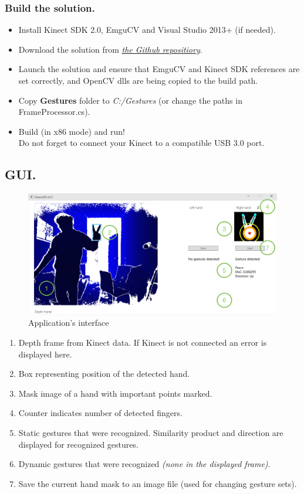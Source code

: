 \documentclass[a4paper,11pt,oneside]{article}
\begin{document}
\subsubsection{Build the solution.}

\begin{itemize}
\item Install Kinect SDK 2.0, EmguCV and Visual Studio 2013+ (if needed).
\item Download the solution from \href{https://github.com/dmitryfd/KinectGR}{\textit{the Github repositiory}}.
\item Launch the solution and ensure that EmguCV and Kinect SDK references are set correctly, and OpenCV dlls are being copied to the build path. 
\item Copy \textbf{Gestures} folder to \textit{C:/Gestures} (or change the paths in FrameProcessor.cs).
\item Build (in x86 mode) and run! \\Do not forget to connect your Kinect to a compatible USB 3.0 port.
\end{itemize}

\subsection{GUI.}

\begin{figure}[H]
\centering
\includegraphics[scale=0.6]{app-gui.png}
\caption{Application's interface}
\end{figure}

\begin{enumerate}
\item Depth frame from Kinect data. If Kinect is not connected an error is displayed here.
\item Box representing position of the detected hand.
\item Mask image of a hand with important points marked.
\item Counter indicates number of detected fingers.
\item Static gestures that were recognized. Similarity product and direction are displayed for recognized gestures.
\item Dynamic gestures that were recognized \textit{(none in the displayed frame)}.
\item Save the current hand mask to an image file (used for changing gesture sets).
\end{enumerate}
\end{document}
